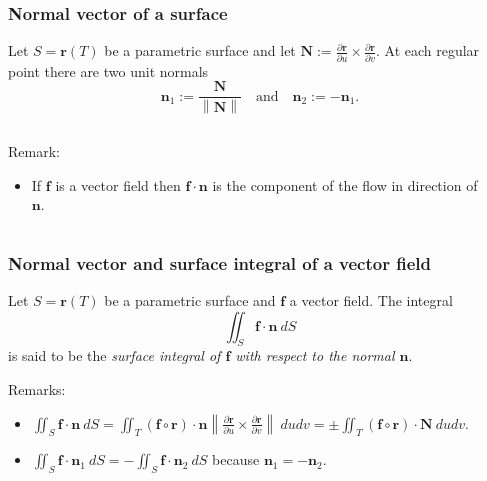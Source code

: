 \documentclass[aspectratio=169]{beamer}
\newcommand{\norm}[1]{\left\|#1\right\|} %
\newcommand{\ff}{\mathbf{f}}
\newcommand{\nn}{\mathbf{n}}
\newcommand{\rr}{\mathbf{r}}
\begin{document}
\begin{frame}
    \frametitle{Normal vector of a surface}

    \begin{definition}
        Let \(S=\rr(T)\) be a parametric surface
        and let \(\mathbf{N}:= {\frac{\partial  \mathbf{r} }{\partial u} \times \frac{\partial  \mathbf{r} }{\partial v}}\).
        At each regular point there are two unit normals
        \[
            \nn_1 := \frac{\mathbf{N}}{\norm{\mathbf{N}}}
            \quad \text{and} \quad
            \nn_2 := -\nn_1.
        \]
    \end{definition}

    \begin{columns}
        \begin{column}{.5\textwidth}

            \begin{block}{Remark:}
                \begin{itemize}
                    \item If \(\ff\) is a vector field then \(\ff \cdot \nn\) is the component of the flow in direction of \(\nn\).
                \end{itemize}
            \end{block}

        \end{column}
        \begin{column}{.5\textwidth}

        \end{column}
    \end{columns}
\end{frame}

\begin{frame}
    \frametitle{Normal vector and surface integral of a vector field}

    \begin{definition}
        Let \(S=\rr(T)\) be a parametric surface and \(\ff\) a vector field.
        The integral
        \[
            \iint_S \ff \cdot \nn \ dS
        \]
        is said to be the \emph{surface integral of \(\ff\) with respect to the normal \(\nn\)}.
    \end{definition}

    \begin{block}{Remarks:}
        \begin{itemize}
            \item \(\iint_S \ff \cdot \nn \ dS
                  = \iint_{T} (\ff\circ \rr) \cdot \nn  \norm{\frac{\partial  \mathbf{r} }{\partial u} \times \frac{\partial  \mathbf{r} }{\partial v}}  \ du dv
                  = \pm \iint_{T} (\ff\circ \rr) \cdot \mathbf{N}    \ du dv\).
            \item \(\iint_S \ff \cdot \nn_1 \ dS = - \iint_S \ff \cdot \nn_2 \ dS\) because \(\nn_1 = - \nn_2\).
        \end{itemize}
    \end{block}

\end{frame}
\end{document}
